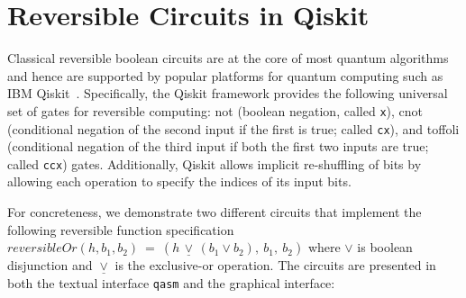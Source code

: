 \section{Reversible Circuits in Qiskit}
\label{sec:qiskit}
\label{sec:examples}

Classical reversible boolean circuits are at the core of most quantum algorithms and hence are supported by popular
platforms for quantum computing such as IBM Qiskit~\cite{aleksandrowiczQiskitOpensourceFramework2019}. Specifically, the
Qiskit framework provides the following universal set of gates for reversible computing: \textsf{not} (boolean negation,
called \verb|x|), \textsf{cnot} (conditional negation of the second input if the first is true; called \verb|cx|), and
\textsf{toffoli} (conditional negation of the third input if both the first two inputs are true; called \verb|ccx|)
gates. Additionally, Qiskit allows implicit re-shuffling of bits by allowing each operation to specify the indices of
its input bits.

For concreteness, we demonstrate two different circuits that implement the
following reversible function specification
$\mathit{reversibleOr}(h,b_1,b_2) ~=~ (h \,\underline{\vee}\, (b_1 \vee b_2),
~b_1, ~b_2)$ where $\vee$ is boolean disjunction and $\underline{\vee}$ is the
exclusive-or operation. The circuits are presented in both the textual interface
\verb|qasm| and the graphical interface:

